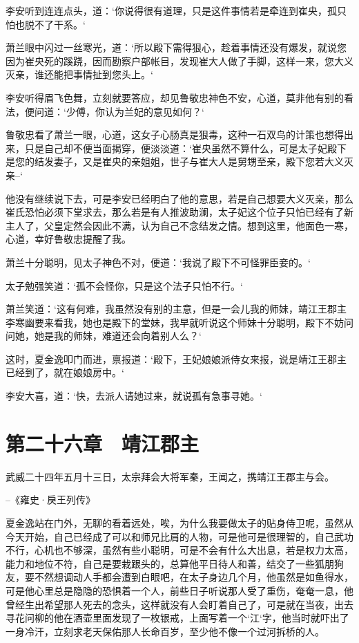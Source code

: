 李安听到连连点头，道：‘你说得很有道理，只是这件事情若是牵连到崔央，孤只怕也脱不了干系。‘

萧兰眼中闪过一丝寒光，道：‘所以殿下需得狠心，趁着事情还没有爆发，就说您因为崔央死的蹊跷，因而勘察户部帐目，发现崔大人做了手脚，这样一来，您大义灭亲，谁还能把事情扯到您头上。‘

李安听得眉飞色舞，立刻就要答应，却见鲁敬忠神色不安，心道，莫非他有别的看法，便问道：‘少傅，你认为兰妃的意见如何？‘

鲁敬忠看了萧兰一眼，心道，这女子心肠真是狠毒，这种一石双鸟的计策也想得出来，只是自己却不便当面揭穿，便淡淡道：‘崔央虽然不算什么，可是太子妃殿下是您的结发妻子，又是崔央的亲姐姐，世子与崔大人是舅甥至亲，殿下您若大义灭亲--‘

他没有继续说下去，可是李安已经明白了他的意思，若是自己想要大义灭亲，那么崔氏恐怕必须下堂求去，那么若是有人推波助澜，太子妃这个位子只怕已经有了新主人了，父皇定然会因此不满，认为自己不念结发之情。想到这里，他面色一寒，心道，幸好鲁敬忠提醒了我。

萧兰十分聪明，见太子神色不对，便道：‘我说了殿下不可怪罪臣妾的。‘

太子勉强笑道：‘孤不会怪你，只是这个法子只怕不行。‘

萧兰笑道：‘这有何难，我虽然没有别的主意，但是一会儿我的师妹，靖江王郡主李寒幽要来看我，她也是殿下的堂妹，我早就听说这个师妹十分聪明，殿下不妨问问她，她是我的师妹，难道还会向着别人么？‘

这时，夏金逸叩门而进，禀报道：‘殿下，王妃娘娘派侍女来报，说是靖江王郡主已经到了，就在娘娘房中。‘

李安大喜，道：‘快，去派人请她过来，就说孤有急事寻她。‘

\chapter{第二十六章　靖江郡主}

武威二十四年五月十三日，太宗拜会大将军秦，王闻之，携靖江王郡主与会。

--《雍史·戾王列传》

夏金逸站在门外，无聊的看着远处，唉，为什么我要做太子的贴身侍卫呢，虽然从今天开始，自己已经成了可以和师兄比肩的人物，可是他可是很理智的，自己武功不行，心机也不够深，虽然有些小聪明，可是不会有什么大出息，若是权力太高，能力和地位不符，自己是要栽跟头的，总算他平日待人和善，结交了一些狐朋狗友，要不然想调动人手都会遭到白眼吧，在太子身边几个月，他虽然是如鱼得水，可是他心里总是隐隐的恐惧着一个人，前些日子听说那人受了重伤，奄奄一息，他曾经生出希望那人死去的念头，这样就没有人会盯着自己了，可是就在当夜，出去寻花问柳的他在酒壶里面发现了一枚银戒，上面写着一个‘江‘字，他当时就吓出了一身冷汗，立刻求老天保佑那人长命百岁，至少他不像一个过河拆桥的人。

